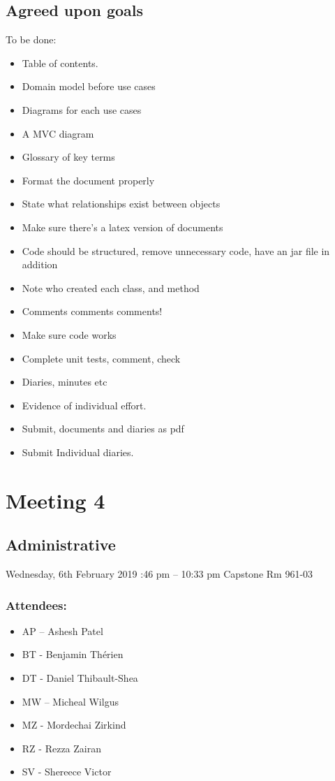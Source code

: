 \documentclass[12pt]{article}
\begin{document}
	\subsection{Agreed upon goals}
	To be done: 
	\begin{itemize}
		\item Table of contents.
		\item Domain model before use cases 
		\item Diagrams for each use cases
		\item A MVC diagram 
		\item Glossary of key terms 
		\item Format the document properly 
		\item State what relationships exist between objects
		\item Make sure there's a latex version of documents 
		\item Code should be structured, remove unnecessary code, have an jar file in addition
		\item Note who created each class, and method 
		\item Comments comments comments!
		\item Make sure code works
		\item Complete unit tests, comment, check 
		\item Diaries, minutes etc
		\item Evidence of individual effort. 
		\item Submit, documents and diaries as pdf 
		\item Submit Individual diaries.
			
	\end{itemize}
	\pagebreak
	
	\section{Meeting 4}
	
	\subsection{Administrative}
	Wednesday, 6th February 2019 :46 pm – 10:33 pm \textbar Capstone Rm 961-03
	\subsubsection{Attendees:}
	
	\begin{itemize}
		\item AP – Ashesh Patel
		\item BT - Benjamin Th\'erien
		\item DT - Daniel Thibault-Shea
		\item MW – Micheal Wilgus
		\item MZ - Mordechai Zirkind  
		\item RZ - Rezza Zairan 
		\item SV - Shereece Victor 
	\end{itemize}
\end{document}
